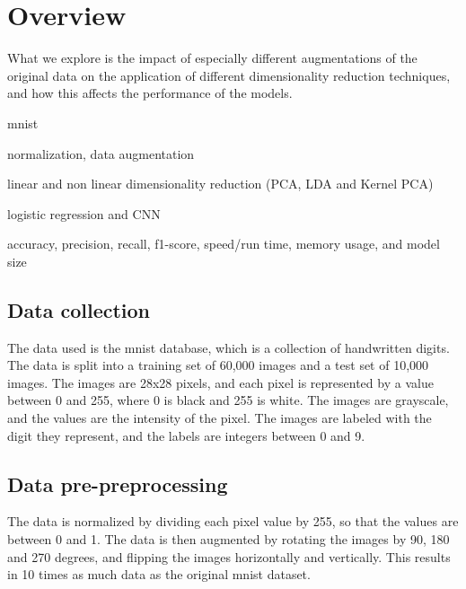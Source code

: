 

\section{Overview}\label{sec:overview}
What we explore is the impact of especially different augmentations of the original data on the application of different dimensionality reduction techniques, and how this affects the performance of the models.


\begin{description}
    \setlength\itemsep{0em}
    \item[dataset] mnist
    \item[pre-preprocessing] normalization, data augmentation
    \item[preprocessing] linear and non linear dimensionality reduction (PCA, LDA and Kernel PCA)
    \item[models] logistic regression and CNN
    \item[evaluation] accuracy, precision, recall, f1-score, speed/run time, memory usage, and model size
\end{description}


\subsection{Data collection}\label{subsec:data-collection}
The data used is the \gls{mnist} database, which is a collection of handwritten digits. The data is split into a training set of 60,000 images and a test set of 10,000 images. The images are 28x28 pixels, and each pixel is represented by a value between 0 and 255, where 0 is black and 255 is white. The images are grayscale, and the values are the intensity of the pixel. The images are labeled with the digit they represent, and the labels are integers between 0 and 9.

\subsection{Data pre-preprocessing}\label{subsec:data-pre-preprocessing}
The data is normalized by dividing each pixel value by 255, so that the values are between 0 and 1. The data is then augmented by rotating the images by 90, 180 and 270 degrees, and flipping the images horizontally and vertically. This results in 10 times as much data as the original \gls{mnist} dataset.

